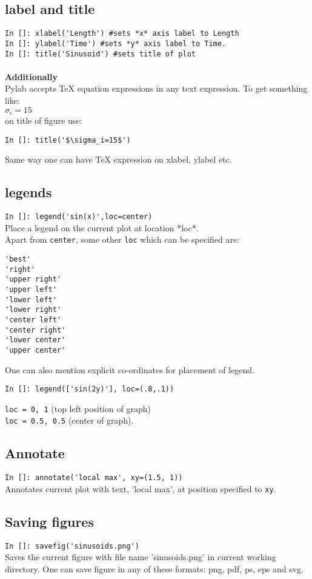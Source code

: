 \documentclass[12pt]{article}
\newcommand{\typ}[1]{\lstinline{#1}}
\begin{document}
\subsection{label and title}
\typ{In []: xlabel('Length') #sets *x* axis label to Length}\\ 
\typ{In []: ylabel('Time') #sets *y* axis label to Time.}\\
\typ{In []: title('Sinusoid') #sets title of plot}\\
\\
\textbf{Additionally}\\
Pylab accepts TeX equation expressions in any text expression. To get something like:\\
$\sigma_i=15$ \\
on title of figure use: 
\begin{lstlisting}
In []: title('$\sigma_i=15$')
\end{lstlisting}  
Same way one can have TeX expression on xlabel, ylabel etc.

\subsection{legends}
\typ{In []: legend('sin(x)',loc=center)} \\
Place a legend on the current plot at location *loc*.\\
Apart from \typ{center}, some other \typ{loc} which can be specified are:
\begin{lstlisting}
'best'
'right'
'upper right'
'upper left'      
'lower left'      
'lower right'     
'center left'     
'center right'    
'lower center'    
'upper center'    
\end{lstlisting}
\newpage
One can also mention explicit co-ordinates for placement of legend. 
\begin{lstlisting}
In []: legend(['sin(2y)'], loc=(.8,.1)) 
\end{lstlisting}
\typ{loc = 0, 1} (top left position of graph)\\
\typ{loc = 0.5, 0.5} (center of graph).

\subsection{Annotate}
\typ{In []: annotate('local max', xy=(1.5, 1))}\\
Annotates current plot with text, 'local max', at position specified to \typ{xy}.

\subsection{Saving figures}
\typ{In []: savefig('sinusoids.png')}\\
Saves the current figure with file name 'sinusoids.png' in current working directory. One can save figure in any of these formats: png, pdf, ps, eps and svg.
\end{document}
